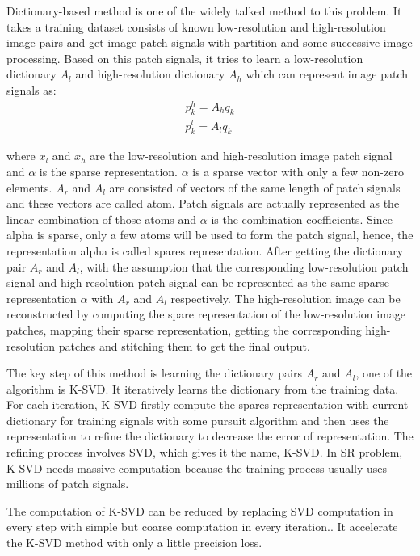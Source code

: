\documentclass[english]{cccconf}
\begin{document}
Dictionary-based method\parencite{jianchao_yang_image_2010,kaibing_zhang_multi-scale_2012} is one of the widely talked method to this problem. It takes a training dataset consists of known low-resolution and high-resolution image pairs and get image patch signals with partition and some successive image processing. Based on this patch signals, it tries to learn a low-resolution dictionary \(A_l\) and high-resolution dictionary \(A_h\) which can represent image patch signals as:
\begin{gather}
    p^h_k = A_hq_k \\
    p^l_k = A_lq_k
	\label{equ1}
\end{gather}

where \(x_l\) and \(x_h\) are the low-resolution and high-resolution image patch signal and \(\alpha\) is the sparse representation. \(\alpha\) is a sparse vector with only a few non-zero elements. \(A_r\) and \(A_l\) are consisted of vectors of the same length of patch signals and these vectors are called atom. Patch signals are actually represented as the linear combination of those atoms and \(\alpha\) is the combination coefficients. Since alpha is sparse\parencite{jianchao_yang_image_2010}, only a few atoms will be used to form the patch signal, hence, the representation alpha is called spares representation. After getting the dictionary pair \(A_r\) and \(A_l\), with the assumption that the corresponding low-resolution patch signal and high-resolution patch signal can be represented as the same sparse representation \(\alpha\) with \(A_r\) and \(A_l\) respectively. The high-resolution image can be reconstructed by computing the spare representation of the low-resolution image patches, mapping their sparse representation, getting the corresponding high-resolution patches and stitching them to get the final output. 

The key step of this method is learning the dictionary pairs \(A_r\) and \(A_l\), one of the algorithm is K-SVD\parencite{aharon_rm_2006}. It iteratively learns the dictionary from the training data. For each iteration, K-SVD firstly compute the spares representation with current dictionary for training signals with some pursuit algorithm and then uses the representation to refine the dictionary to decrease the error of representation. The refining process involves SVD, which gives it the name, K-SVD. In SR problem, K-SVD needs massive computation because the training process usually uses millions of patch signals. 

The computation of K-SVD can be reduced by replacing SVD computation in every step with simple but coarse computation in every iteration.\Cite{irofti_gpu_2014,rubinstein_efficient_2009}. It accelerate the K-SVD method with only a little precision loss. 
\end{document}

